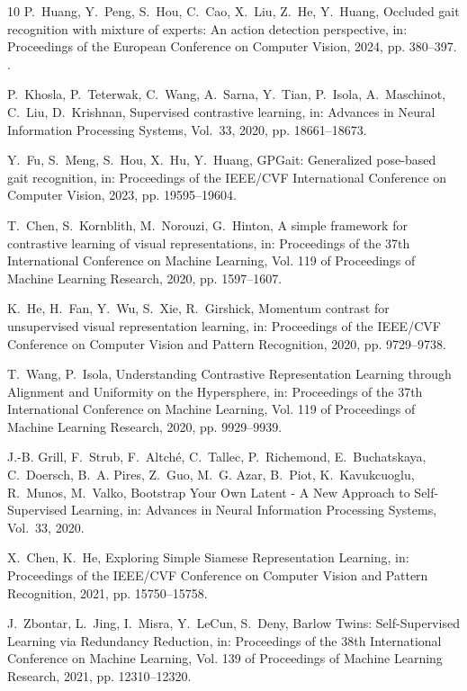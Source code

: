 \documentclass[review,12pt]{elsarticle}
\begin{document}
\begin{thebibliography}{10}
P.~Huang, Y.~Peng, S.~Hou, C.~Cao, X.~Liu, Z.~He, Y.~Huang, Occluded gait
  recognition with mixture of experts: An action detection perspective, in:
  {Proceedings of the European Conference on Computer Vision}, 2024, pp.
  380--397.
\newblock \href {https://doi.org/10.1007/978-3-031-72658-3_22}
  {}.

P.~Khosla, P.~Teterwak, C.~Wang, A.~Sarna, Y.~Tian, P.~Isola, A.~Maschinot,
  C.~Liu, D.~Krishnan, Supervised contrastive learning, in: {Advances in Neural
  Information Processing Systems}, Vol.~33, 2020, pp. 18661--18673.

Y.~Fu, S.~Meng, S.~Hou, X.~Hu, Y.~Huang, {GPGait}: Generalized pose-based gait
  recognition, in: {Proceedings of the IEEE/CVF International Conference on
  Computer Vision}, 2023, pp. 19595--19604.

T.~Chen, S.~Kornblith, M.~Norouzi, G.~Hinton, A simple framework for
  contrastive learning of visual representations, in: {Proceedings of the 37th
  International Conference on Machine Learning}, Vol. 119 of Proceedings of
  Machine Learning Research, 2020, pp. 1597--1607.

K.~He, H.~Fan, Y.~Wu, S.~Xie, R.~Girshick, Momentum contrast for unsupervised
  visual representation learning, in: {Proceedings of the IEEE/CVF Conference
  on Computer Vision and Pattern Recognition}, 2020, pp. 9729--9738.

T.~Wang, P.~Isola, {Understanding Contrastive Representation Learning through
  Alignment and Uniformity on the Hypersphere}, in: {Proceedings of the 37th
  International Conference on Machine Learning}, Vol. 119 of Proceedings of
  Machine Learning Research, 2020, pp. 9929--9939.

J.-B. Grill, F.~Strub, F.~Altch{\'e}, C.~Tallec, P.~Richemond, E.~Buchatskaya,
  C.~Doersch, B.~A. Pires, Z.~Guo, M.~G. Azar, B.~Piot, K.~Kavukcuoglu,
  R.~Munos, M.~Valko, {Bootstrap Your Own Latent - A New Approach to
  Self-Supervised Learning}, in: {Advances in Neural Information Processing
  Systems}, Vol.~33, 2020.

X.~Chen, K.~He, {Exploring Simple Siamese Representation Learning}, in:
  {Proceedings of the IEEE/CVF Conference on Computer Vision and Pattern
  Recognition}, 2021, pp. 15750--15758.

J.~Zbontar, L.~Jing, I.~Misra, Y.~LeCun, S.~Deny, {Barlow Twins:
  Self-Supervised Learning via Redundancy Reduction}, in: {Proceedings of the
  38th International Conference on Machine Learning}, Vol. 139 of Proceedings
  of Machine Learning Research, 2021, pp. 12310--12320.


\end{thebibliography}
\end{document}
